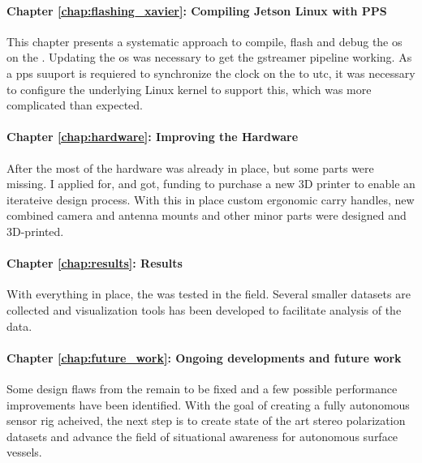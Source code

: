 \paragraph{Chapter \ref{chap:flashing_xavier}: Compiling Jetson Linux with PPS}
This chapter presents a systematic approach to compile, flash and debug the \gls{os} on the \jx.
Updating the \gls{os} was necessary to get the \gls{gstreamer} pipeline working.
As a \gls{pps} suuport is requiered  to synchronize the clock on the \jx to \gls{utc}, it was necessary to configure the underlying Linux kernel to support this, which was more complicated than expected.

\paragraph{Chapter \ref{chap:hardware}: Improving the Hardware}
After the \preproject most of the hardware was already in place, but some parts were missing.
I applied for, and got, funding to purchase a new 3D printer to enable an iterateive design process.
With this in place custom ergonomic carry handles, new combined camera and antenna mounts and other minor parts were designed and 3D-printed.

\paragraph{Chapter \ref{chap:results}: Results}
With everything in place, the \sr was tested in the field.
Several smaller datasets are collected and visualization tools has been developed to facilitate analysis of the data.

\paragraph{Chapter \ref{chap:future_work}: Ongoing developments and future work}
Some design flaws from the \preproject remain to be fixed and a few possible performance improvements have been identified.
With the goal of creating a fully autonomous sensor rig acheived, the next step is to create state of the art stereo polarization datasets and advance the field of situational awareness for autonomous surface vessels.